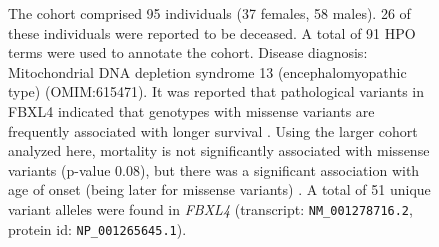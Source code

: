 \begin{figure}[htbp]
\caption{The cohort comprised 95 individuals (37 females, 58 males). 26 of these individuals were reported to be deceased. 
A total of 91 HPO terms were used to annotate the cohort. Disease diagnosis: Mitochondrial DNA depletion syndrome 13 (encephalomyopathic type)
 (OMIM:615471). It was reported that pathological variants in FBXL4 indicated that genotypes with 
 missense variants are frequently associated with longer survival \cite{PMID_28940506}. 
 Using the larger cohort analyzed here, mortality is not significantly associated with 
 missense variants (p-value 0.08), but there was a significant association with age of onset (being later for missense variants) \cite{PMID_28940506}.
 A total of 51 unique variant alleles were found in \textit{FBXL4} (transcript: \texttt{NM\_001278716.2}, protein id: \texttt{NP\_001265645.1}).}
\end{figure}
